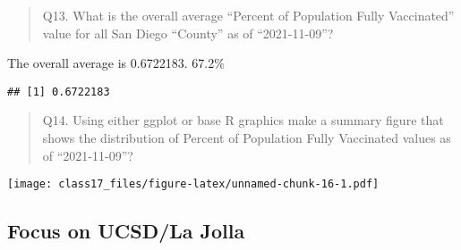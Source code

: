 \documentclass[
]{article}
\newenvironment{Shaded}{\begin{snugshade}}{\end{snugshade}}
\newcommand{\AttributeTok}[1]{\textcolor[rgb]{0.77,0.63,0.00}{#1}}
\newcommand{\ConstantTok}[1]{\textcolor[rgb]{0.00,0.00,0.00}{#1}}
\newcommand{\FunctionTok}[1]{\textcolor[rgb]{0.00,0.00,0.00}{#1}}
\newcommand{\NormalTok}[1]{#1}
\newcommand{\OtherTok}[1]{\textcolor[rgb]{0.56,0.35,0.01}{#1}}
\newcommand{\SpecialCharTok}[1]{\textcolor[rgb]{0.00,0.00,0.00}{#1}}
\newcommand{\StringTok}[1]{\textcolor[rgb]{0.31,0.60,0.02}{#1}}
\begin{document}
\begin{quote}
Q13. What is the overall average ``Percent of Population Fully
Vaccinated'' value for all San Diego ``County'' as of ``2021-11-09''?
\end{quote}

The overall average is 0.6722183. 67.2\%

\begin{Shaded}
\end{Shaded}

\begin{verbatim}
## [1] 0.6722183
\end{verbatim}

\begin{quote}
Q14. Using either ggplot or base R graphics make a summary figure that
shows the distribution of Percent of Population Fully Vaccinated values
as of ``2021-11-09''?
\end{quote}

\begin{Shaded}
\end{Shaded}

\texttt{[image: class17\_files/figure-latex/unnamed-chunk-16-1.pdf]}

\hypertarget{focus-on-ucsdla-jolla}{%
\subsection{Focus on UCSD/La Jolla}\label{focus-on-ucsdla-jolla}}
\end{document}
